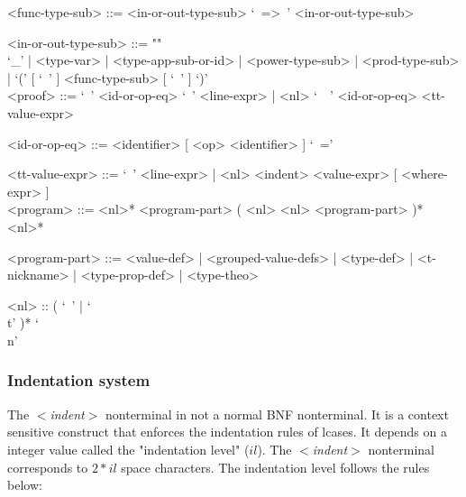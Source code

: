 \documentclass{article}
\begin{document}
\begin{grammar}
<func-type-sub> ::= <in-or-out-type-sub> `\ =>\ ' <in-or-out-type-sub>

<in-or-out-type-sub> ::= ""\\
`_' | <type-var> | <type-app-sub-or-id> | <power-type-sub> | <prod-type-sub> |
`(' [ `\ ' ] <func-type-sub> [ `\ ' ] `)'
\\

<proof> ::=
`\ ' <id-or-op-eq> `\ ' <line-expr> |
<nl> `\ \ ' <id-or-op-eq>  <tt-value-expr>

<id-or-op-eq> ::= <identifier> [ <op> <identifier> ] `\ ='

<tt-value-expr> ::=
`\ ' <line-expr> | <nl> <indent> <value-expr> [ <where-expr> ]
\\

<program> ::=
<nl>* <program-part> ( <nl> <nl> <program-part> )* <nl>*

<program-part> ::=
<value-def> | <grouped-value-defs> | <type-def> | <t-nickname> |
<type-prop-def> | <type-theo>

<nl> :: ( `\ ' | `\\t' )* `\\n'
\end{grammar}

\newpage

\subsubsection{Indentation system}
\label{subsubsec:indsys}

The \textit{$<$indent$>$} nonterminal in not a normal BNF nonterminal. It is a
context sensitive construct that enforces the indentation rules of lcases.
It depends on a integer value called the "indentation level" ($il$).
The \textit{$<$indent$>$} nonterminal corresponds to $2*il$ space characters.
The indentation level follows the rules below:
\end{document}

